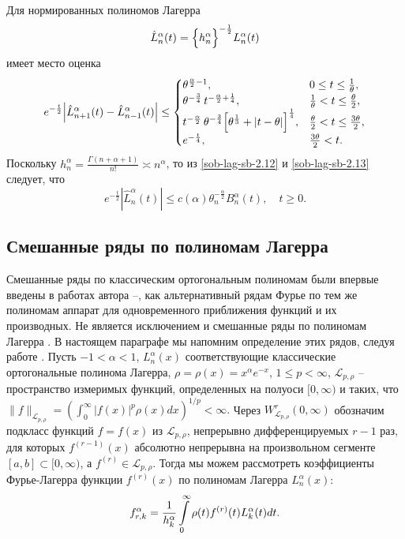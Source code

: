 Для нормированных полиномов Лагерра
\begin{equation}\label{sob-lag-sb-2.13}
\hat{L}_n^\alpha(t)=
\Bigl\{h_n^\alpha \Bigr\}^{-\frac{1}{2}} L_n^\alpha(t)
\end{equation}
имеет место оценка \cite{sob-lag-sb-AskeyWaiger}
\begin{equation}\label{sob-lag-sb-2.14}
e^{-\frac{t}{2}}
\Bigl|
\hat{L}_{n+1}^\alpha(t)-
\hat{L}_{n-1}^\alpha(t)
\Bigr|\le
\begin{cases}
\theta^{\frac{\alpha}{2}-1}, &0 \le t \le \frac{1}{\theta},\\
\theta^{-\frac{3}{4}}\,t^{-\frac{\alpha}{2} + \frac{1}{4}}, & \frac{1}{\theta} < t \le \frac{\theta}{2},\\
t^{-\frac{\alpha}{2}}\,
\theta^{-\frac{3}{4}}
\Bigl[
\theta^{\frac{1}{3}}+|t-\theta|
\Bigr]^{\frac{1}{4}}, & \frac{\theta}{2} < t \le \frac{3\theta}{2},\\
e^{-\frac{t}{4}}, &\frac{3\theta}{2}< t.
\end{cases}
\end{equation}
Поскольку $h_n^\alpha=\frac{\Gamma(n+\alpha+1)}{n!} \asymp n^\alpha$, то из \eqref{sob-lag-sb-2.12} и \eqref{sob-lag-sb-2.13} следует, что
\begin{equation}\label{sob-lag-sb-2.15}
e^{-\frac{t}{2}}
|\hat{L}_n^\alpha(t)|\le
c(\alpha)\theta_n^{-\frac{\alpha}{2}}B_n^\alpha(t), \quad t \ge 0.
\end{equation}

\subsection{Смешанные ряды по полиномам Лагерра}
Смешанные ряды по классическим ортогональным полиномам были впервые введены в работах автора \cite{Haar-Tcheb-Shar11}--\cite{Haar-Tcheb-Shar16}, как альтернативный
рядам Фурье по тем же полиномам аппарат для одновременного приближения функций и их производных. Не является исключением и смешанные ряды по полиномам Лагерра \cite{Haar-Tcheb-Shar13}. В настоящем параграфе мы напомним определение этих рядов, следуя работе \cite{Haar-Tcheb-Shar13}. Пусть $-1<\alpha<1$,      $L_n^\alpha(x)$ соответствующие классические ортогональные полинома Лагерра, $\rho=\rho(x)=x^\alpha e^{-x}$, $1\le p<\infty $,  $\mathcal{L}_{p,\rho}$ -- пространство измеримых функций,
определенных на полуоси $[0,\infty)$ и таких, что
     $
\|f\|_{\mathcal{L}_{p,\rho}}=
\left(\int_0^\infty|f(x)|^p\rho(x)dx\right)^{1/p}<\infty.
   $
 Через $W_{\mathcal{L}_{p,\rho}}^r(0,\infty)$ обозначим  подкласс функций $f=f(x)$ из $\mathcal{L}_{p,\rho}$,
непрерывно дифференцируемых $r-1$ раз, для которых $f^{(r-1)}(x)$
абсолютно непрерывна на произвольном сегменте $[a,b]\subset[0,\infty)$,
а $f^{(r)}\in \mathcal{L}_{p,\rho}$. Тогда мы можем рассмотреть
коэффициенты Фурье-Лагерра функции $f^{(r)}(x)$ по полиномам Лагерра
     $L_n^\alpha(x)$:
     \begin{equation}\label{sob-lag-sb-3.1}
f_{r,k}^\alpha=
{1\over h_k^\alpha}\int\limits_0^\infty\rho(t)f^{(r)}(t)L_k^\alpha(t)dt.
\end{equation}

